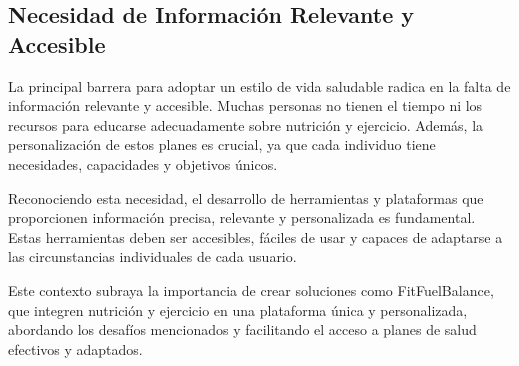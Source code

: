 \begin{description}
  \subsection{Necesidad de Información Relevante y Accesible}
  La principal barrera para adoptar un estilo de vida saludable radica en la falta de información relevante y accesible. Muchas personas no tienen el tiempo ni los recursos para educarse adecuadamente sobre nutrición y ejercicio. Además, la personalización de estos planes es crucial, ya que cada individuo tiene necesidades, capacidades y objetivos únicos.

Reconociendo esta necesidad, el desarrollo de herramientas y plataformas que proporcionen información precisa, relevante y personalizada es fundamental. Estas herramientas deben ser accesibles, fáciles de usar y capaces de adaptarse a las circunstancias individuales de cada usuario.

Este contexto subraya la importancia de crear soluciones como FitFuelBalance, que integren nutrición y ejercicio en una plataforma única y personalizada, abordando los desafíos mencionados y facilitando el acceso a planes de salud efectivos y adaptados.
\end{description}